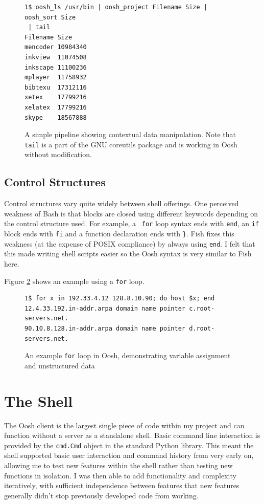 \documentclass[12pt,twoside,notitlepage]{report}
\begin{document}
\begin{figure}[h]
\begin{Verbatim}[frame=single,framerule=0.2pt,framesep=5pt]
1$ oosh_ls /usr/bin | oosh_project Filename Size | oosh_sort Size
 | tail
Filename Size
mencoder 10984340
inkview  11074508
inkscape 11100236
mplayer  11758932
bibtexu  17312116
xetex    17799216
xelatex  17799216
skype    18567888
\end{Verbatim}
  \caption{A simple pipeline showing contextual data
    manipulation. Note that {\tt tail} is a part of the GNU coreutils
    package and is working in Oosh without modification.}
\label{lsexample}
\end{figure}

\subsection{Control Structures}
\label{forexample}

Control structures vary quite widely between shell offerings. One
perceived weakness of Bash is that blocks are closed using different
keywords depending on the control structure used. For example, a {\tt
  for} loop syntax ends with {\tt end}, an {\tt if} block ends with
{\tt fi} and a function declaration ends with {\tt \}}. Fish fixes
this weakness (at the expense of POSIX compliance) by always using
{\tt end}. I felt that this made writing shell scripts easier so the
Oosh syntax is very similar to Fish here.

Figure \ref{forloop} shows an example using a {\tt for} loop.

\begin{figure}[h]
\begin{Verbatim}[frame=single,framerule=0.2pt,framesep=5pt]
1$ for x in 192.33.4.12 128.8.10.90; do host $x; end
12.4.33.192.in-addr.arpa domain name pointer c.root-servers.net.
90.10.8.128.in-addr.arpa domain name pointer d.root-servers.net.
\end{Verbatim}
\caption{An example {\tt for} loop in Oosh, demonstrating variable
  assignment and unstructured data}
\label{forloop}
\end{figure}

\section{The Shell}
The Oosh client is the largest single piece of code within my project
and can function without a server as a standalone shell. Basic command
line interaction is provided by the {\tt cmd.Cmd} object in the
standard Python library. This meant the shell supported basic user
interaction and command history from very early on, allowing me to
test new features within the shell rather than testing new functions
in isolation. I was then able to add functionality and complexity
iteratively, with sufficient independence between features that new
features generally didn't stop previously developed code from working.
\end{document}
